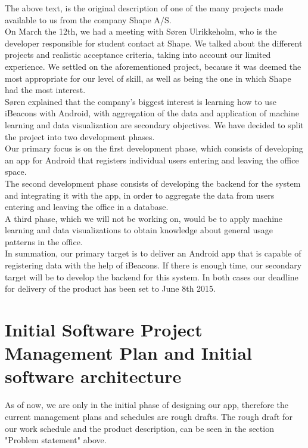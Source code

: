 \documentclass[12pt]{article}
\begin{document}
The above text, is the original description of one of the many projects made available to us from the company Shape A/S.\\

On March the 12th, we had a meeting with S\o ren Ulrikkeholm, who is the developer responsible for student contact at Shape. We talked about the different projects and realistic acceptance criteria, taking into account our limited experience. We settled on the aforementioned project, because it was deemed the most appropriate for our level of skill, as well as being the one in which Shape had the most interest.\\

S\o ren explained that the company's biggest interest is learning how to use iBeacons with Android, with aggregation of the data and application of machine learning and data visualization are secondary objectives. We have decided to split the project into two development phases.\\

Our primary focus is on the first development phase, which consists of developing an app for Android that registers individual users entering and leaving the office space.\\

The second development phase consists of developing the backend for the system and integrating it with the app, in order to aggregate the data from users entering and leaving the office in a database.\\
A third phase, which we will not be working on, would be to apply machine learning and data visualizations to obtain knowledge about general usage patterns in the office.\\

In summation, our primary target is to deliver an Android app that is capable of registering data with the help of iBeacons. If there is enough time, our secondary target will be to develop the backend for this system. In both cases our deadline for delivery of the product has been set to June 8th 2015.\\


\section{Initial Software Project Management Plan and Initial software architecture}

As of now, we are only in the initial phase of designing our app, therefore the current management plans and schedules are rough drafts. The rough draft for our work schedule and the product description, can be seen in the section "Problem statement" above.
\end{document}
